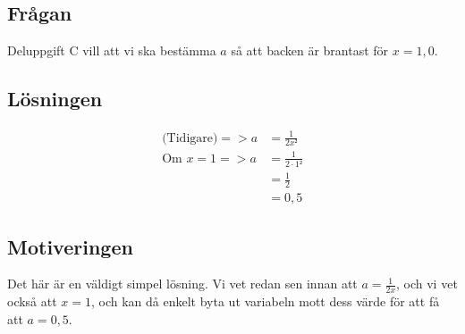 \documentclass[a4paper,12pt]{article}
\begin{document}
    \subsection{Frågan}
    
      Deluppgift C \cite{Skolverk} vill att vi ska bestämma $a$ så att backen 
      är brantast för $x = 1,0$.

    \subsection{Lösningen}
    \label{eq:3}
      \begin{align}
        \text{(Tidigare)}
        => a &= \frac{1}{2x²} \nonumber 
        \\
        \text{Om } 
        x = 1 => 
        a &= \frac{1}{2\cdot1²} \nonumber 
        \\
        &= \frac{1}{2} \nonumber 
        \\
        &= 0,5
      \end{align}

    \subsection{Motiveringen}
      Det här är en väldigt simpel lösning. Vi vet redan sen innan att 
      $a = \frac{1}{2x}$, och vi vet också att $x = 1$, och kan då enkelt 
      byta ut variabeln mott dess värde för att få att $a = 0,5$.
\end{document}
